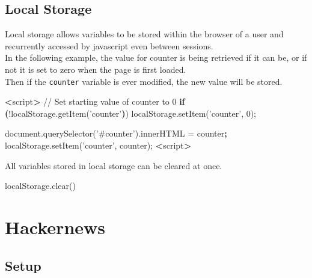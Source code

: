 \documentclass[]{book}
\newenvironment{Shaded}{\begin{snugshade}}{\end{snugshade}}
\newcommand{\ExtensionTok}[1]{#1}
\newcommand{\KeywordTok}[1]{\textcolor[rgb]{0.13,0.29,0.53}{\textbf{#1}}}
\newcommand{\NormalTok}[1]{#1}
\newcommand{\OperatorTok}[1]{\textcolor[rgb]{0.81,0.36,0.00}{\textbf{#1}}}
\newcommand{\StringTok}[1]{\textcolor[rgb]{0.31,0.60,0.02}{#1}}
\begin{document}
\hypertarget{local-storage}{%
\section{Local Storage}\label{local-storage}}

Local storage allows variables to be stored within the browser of a user and recurrently accessed by javascript even between sessions.\\
In the following example, the value for counter is being retrieved if it can be, or if not it is set to zero when the page is first loaded.\\
Then if the \texttt{counter} variable is ever modified, the new value will be stored.

\begin{Shaded}
\begin{Highlighting}[]
\OperatorTok{<}\ExtensionTok{script}\OperatorTok{>}
    \ExtensionTok{//}\NormalTok{ Set starting value of counter to 0  }
    \KeywordTok{if} \KeywordTok{(}\NormalTok{!}\ExtensionTok{localStorage.getItem}\NormalTok{(}\StringTok{'counter'}\KeywordTok{)}\NormalTok{)  }
        \ExtensionTok{localStorage.setItem}\NormalTok{(}\StringTok{'counter'}\NormalTok{, 0);}

    \ExtensionTok{document.querySelector}\NormalTok{(}\StringTok{'#counter'}\NormalTok{)}\ExtensionTok{.innerHTML}\NormalTok{ = counter}\KeywordTok{;}
    \ExtensionTok{localStorage.setItem}\NormalTok{(}\StringTok{'counter'}\NormalTok{, counter);}
\OperatorTok{<}\ExtensionTok{script}\OperatorTok{>}
\end{Highlighting}
\end{Shaded}

All variables stored in local storage can be cleared at once.

\begin{Shaded}
\begin{Highlighting}[]
\ExtensionTok{localStorage.clear}\NormalTok{()}
\end{Highlighting}
\end{Shaded}

\hypertarget{hackernews}{%
\chapter{Hackernews}\label{hackernews}}

\hypertarget{setup-1}{%
\section{Setup}\label{setup-1}}
\end{document}

